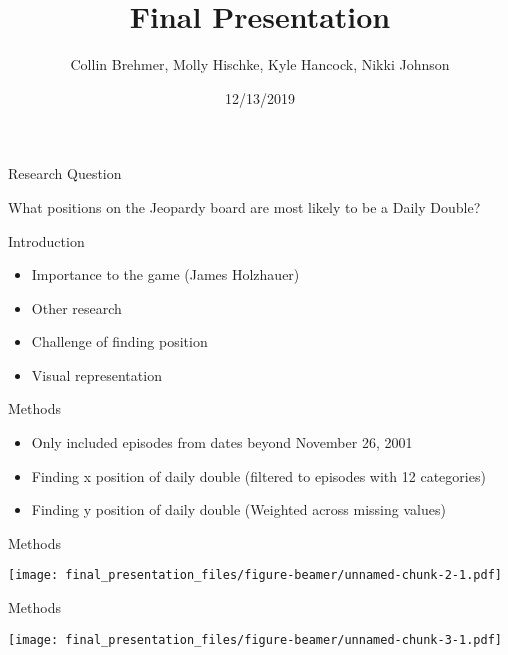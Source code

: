 \documentclass[
  ignorenonframetext,
]{beamer}
\title{Final Presentation}
\author{Collin Brehmer, Molly Hischke, Kyle Hancock, Nikki Johnson}
\date{12/13/2019}
\providecommand{\tightlist}{%
  \setlength{\itemsep}{0pt}\setlength{\parskip}{0pt}}
\begin{document}
\frame{\titlepage}

\begin{frame}{Research Question}
\protect\hypertarget{research-question}{}

What positions on the Jeopardy board are most likely to be a Daily
Double?

\end{frame}

\begin{frame}{Introduction}
\protect\hypertarget{introduction}{}

\begin{itemize}
\tightlist
\item
  Importance to the game (James Holzhauer)
\item
  Other research
\item
  Challenge of finding position
\item
  Visual representation
\end{itemize}

\end{frame}

\begin{frame}{Methods}
\protect\hypertarget{methods}{}

\begin{itemize}
\tightlist
\item
  Only included episodes from dates beyond November 26, 2001
\item
  Finding x position of daily double (filtered to episodes with 12
  categories)
\item
  Finding y position of daily double (Weighted across missing values)
\end{itemize}

\end{frame}

\begin{frame}{Methods}
\protect\hypertarget{methods-1}{}

\texttt{[image: final\_presentation\_files/figure-beamer/unnamed-chunk-2-1.pdf]}

\end{frame}

\begin{frame}{Methods}
\protect\hypertarget{methods-2}{}

\texttt{[image: final\_presentation\_files/figure-beamer/unnamed-chunk-3-1.pdf]}

\end{frame}
\end{document}
